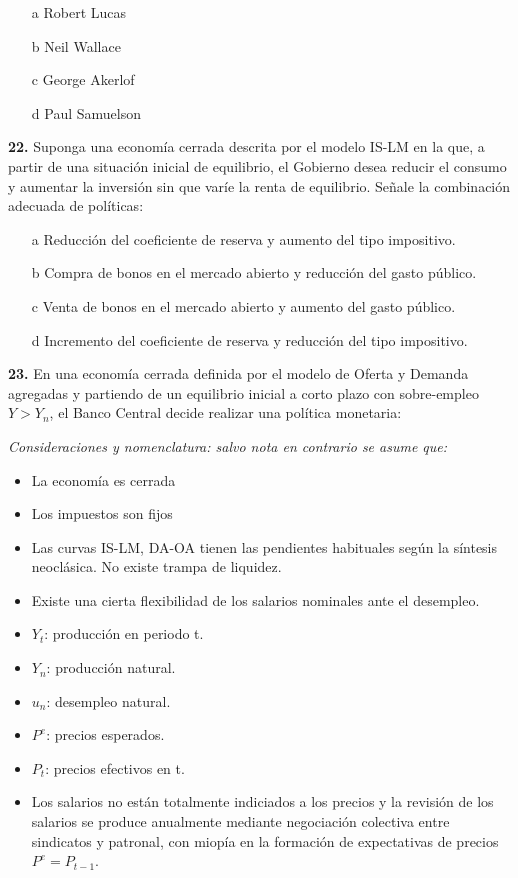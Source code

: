 \documentclass{nuevotema}
\begin{document}
\begin{itemize}
	\item[a] Robert Lucas
	\item[b] Neil Wallace
	\item[c] George Akerlof
	\item[d] Paul Samuelson
\end{itemize}


\textbf{22.} Suponga una economía cerrada descrita por el modelo IS-LM en la que, a partir de una situación inicial de equilibrio, el Gobierno desea reducir el consumo y aumentar la inversión sin que varíe la renta de equilibrio. Señale la combinación adecuada de políticas:

\begin{enumerate}
	\item[a] Reducción del coeficiente de reserva y aumento del tipo impositivo.
	\item[b] Compra de bonos en el mercado abierto y reducción del gasto público.
	\item[c] Venta de bonos en el mercado abierto y aumento del gasto público.
	\item[d] Incremento del coeficiente de reserva y reducción del tipo impositivo.
\end{enumerate}

\textbf{23.} En una economía cerrada definida por el modelo de Oferta y Demanda agregadas y partiendo de un equilibrio inicial a corto plazo con sobre-empleo $Y > Y_n$, el Banco Central decide realizar una política monetaria:

\textit{Consideraciones y nomenclatura: salvo nota en contrario se asume que:}

\begin{itemize}
	\item La economía es cerrada
	\item Los impuestos son fijos
	\item Las curvas IS-LM, DA-OA tienen las pendientes habituales según la síntesis neoclásica. No existe trampa de liquidez.
	\item Existe una cierta flexibilidad de los salarios nominales ante el desempleo.
	\item $Y_t$: producción en periodo t.
	\item $Y_n$: producción natural.
	\item $u_n$: desempleo natural.
	\item $P^e$: precios esperados.
	\item $P_t$: precios efectivos en t.
	\item Los salarios no están totalmente indiciados a los precios y la revisión de los salarios se produce anualmente mediante negociación colectiva entre sindicatos y patronal, con miopía en la formación de expectativas de precios $P^e=P_{t-1}$.
\end{itemize}
\end{document}

